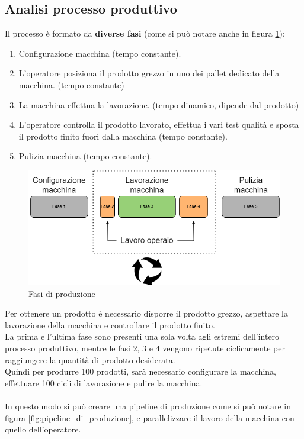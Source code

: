 \subsection{Analisi processo produttivo}
Il processo è formato da \textbf{diverse fasi} (come si può notare anche in figura \ref{fig:fasi_di_produzione}):
\begin{enumerate}
    \item Configurazione macchina (tempo constante).
    \item L'operatore posiziona il prodotto grezzo in uno dei pallet dedicato della macchina. (tempo constante)
    \item La macchina effettua la lavorazione. (tempo dinamico, dipende dal prodotto)
    \item L'operatore controlla il prodotto lavorato, effettua i vari test qualità e sposta il prodotto finito fuori dalla macchina (tempo constante).
    \item Pulizia macchina (tempo constante).
\end{enumerate}
\begin{figure}[H]
    \centering
    \includegraphics[width=\textwidth]{media/fasi_di_produzione.drawio.png}
    \caption{Fasi di produzione}
    \label{fig:fasi_di_produzione}
\end{figure}
Per ottenere un prodotto è necessario disporre il prodotto grezzo, aspettare la lavorazione della macchina e controllare il prodotto finito.\\
La prima e l'ultima fase sono presenti una sola volta agli estremi dell'intero processo produttivo, mentre le fasi 2, 3 e 4 vengono ripetute ciclicamente per raggiungere la quantità di prodotto desiderata.\\ 
Quindi per produrre 100 prodotti, sarà necessario configurare la macchina, effettuare 100 cicli di lavorazione e pulire la macchina.
\\ \\
In questo modo si può creare una pipeline di produzione come si può notare in figura \ref{fig:pipeline_di_produzione}, e parallelizzare il lavoro della macchina con quello dell'operatore.

